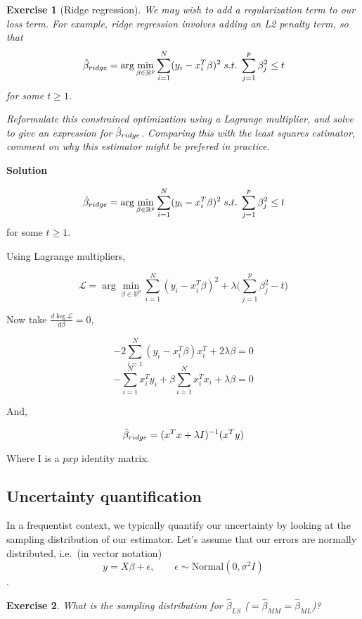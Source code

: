 \documentclass[twoside]{article}
\newcounter{lecnum}
\newtheorem{exercise}{Exercise}[lecnum]
\begin{document}
\begin{exercise}[Ridge regression]
  We may wish to add a regularization term to our loss term. For example, ridge regression involves adding an L2 penalty term, so that
  $$\hat{\beta}_{\small{ridge}} = \arg\min_{\beta\in \mathbb{R}^p}\sum_{i=1}^N(y_i - x_i^T\beta)^2 \; s.t. \; \sum_{j=1}^p \beta_j^2 \leq t$$
  for some $t\geq 1$.

  Reformulate this constrained optimization using a Lagrange multiplier, and solve to give an expression for $\hat{\beta}_{\small{ridge}}$. Comparing this with the least squares estimator, comment on why this estimator might be prefered in practice.
\end{exercise}

\color{blue}
\textbf{Solution}

 $$\hat{\beta}_{\small{ridge}} = \arg\min_{\beta\in \mathbb{R}^p}\sum_{i=1}^N(y_i - x_i^T\beta)^2 \; s.t. \; \sum_{j=1}^p \beta_j^2 \leq t$$
for some $t\geq 1$.

Using Lagrange multipliers,

$$\mathcal{L} = \arg\min_{\beta\in \mathbb{R}^p}\sum_{i=1}^N(y_i - x_i^T\beta)^2 + \lambda \bigg(\sum_{j=1}^p \beta_j^2 - t\bigg) $$

Now take  $ \frac{d \log{\mathcal{L}}}{d\beta} = 0  $,

$$ -2\sum_{i=1}^{N} (y_i - x_i^T\beta)x_i^T + 2 \lambda \beta = 0$$
$$ -\sum_{i=1}^{N} x_i^Ty_i+\beta \sum_{i=1}^{N} x_i^Tx_i + \lambda \beta  = 0$$

And,

$$ \hat{\beta}_{\small{ridge}} =  (  x^T x + \lambda I  )^{-1}  ( x ^T y  )$$


Where I is a $pxp$ identity matrix.

\color{black}

  
\subsection{Uncertainty quantification}

In a frequentist context, we typically quantify our uncertainty by looking at the sampling distribution of our estimator. Let's assume that our errors are normally distributed, i.e.\ (in vector notation)
$$y = X\beta+\epsilon,\qquad \epsilon \sim \mbox{Normal}(0,\sigma^2 I)$$.

\begin{exercise}
  What is the sampling distribution for $\hat{\beta}_{LS}$ ($=\hat{\beta}_{MM}=\hat{\beta}_{ML}$)?
\end{exercise}
\end{document}
